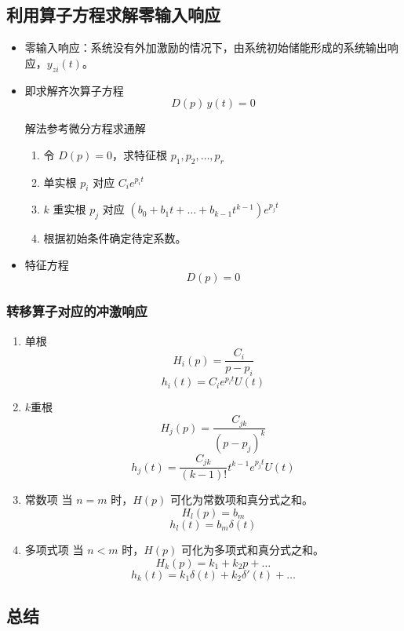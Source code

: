 \documentclass[UTF8]{ctexart}
\begin{document}
\subsection{利用算子方程求解零输入响应}

\begin{itemize}
    \item 零输入响应：系统没有外加激励的情况下，由系统初始储能形成的系统输出响应，$y_{zi}(t)$。
    \item 即求解齐次算子方程
    $$
    D(p)\,y(t) = 0
    $$
    
    解法参考微分方程求通解
    
    \begin{enumerate}
        \item 令 $D(p)=0$，求特征根 $p_1, p_2, \ldots, p_r$
        \item 单实根 $p_i$ 对应 $C_i e^{p_i t}$
        \item $k$ 重实根 $p_j$ 对应 $\left(b_0 + b_1 t + \ldots + b_{k-1} t^{k-1}\right) e^{p_j t}$
        \item 根据初始条件确定待定系数。
    \end{enumerate}
    
    \item 特征方程
    $$
    D(p) = 0
    $$
\end{itemize}

\subsubsection{转移算子对应的冲激响应}

\begin{enumerate}
    \item 单根
    $$
    H_i(p) = \frac{C_i}{p - p_i}
    $$
    $$
    h_i(t) = C_i e^{p_i t} U(t)
    $$
    \item $k$重根
    $$
    H_j(p) = \frac{C_{jk}}{(p - p_j)^k}
    $$
    $$
    h_j(t) = \frac{C_{jk}}{(k-1)!} t^{k-1} e^{p_j t} U(t)
    $$
    \item 常数项
    当 $n = m$ 时，$H(p)$ 可化为常数项和真分式之和。
    $$
    H_l(p) = b_m
    $$
    $$
    h_l(t) = b_m \delta(t)
    $$
    \item 多项式项
    当 $n < m$ 时，$H(p)$ 可化为多项式和真分式之和。
    $$
    H_k(p) = k_1 + k_2 p + \dots
    $$
    $$
    h_k(t) = k_1 \delta(t) + k_2 \delta'(t) + \dots
    $$
\end{enumerate}

\subsection{总结}
\end{document}
